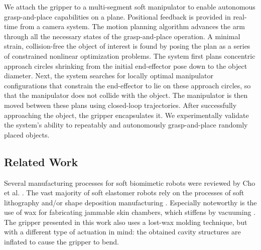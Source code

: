 We attach the gripper to a multi-segment soft manipulator to enable autonomous grasp-and-place capabilities on a plane. 
Positional feedback is provided in real-time from a camera system.
The motion planning algorithm advances the arm through all the necessary states of the grasp-and-place operation.
A minimal strain, collision-free  the object of interest is found by posing the plan as a series of constrained nonlinear optimization problems.
The system first plans concentric approach circles shrinking from the initial end-effector pose down to the object diameter.
Next, the system searches for locally optimal manipulator configurations that constrain the end-effector to lie on these approach circles, so that the manipulator does not collide with the object. 
The manipulator is then moved between these plans using closed-loop trajectories. 
After successfully approaching the object, the gripper encapsulates it.
We experimentally validate the system's ability to repeatably and autonomously grasp-and-place randomly placed objects.

\subsection{Related Work}

Several manufacturing processes for soft biomimetic robots were reviewed by Cho et al. \cite{cho2009review}. 
The vast majority of soft elastomer robots rely on the processes of soft lithography \cite{xia1998soft} and/or shape deposition manufacturing \cite{cham2002fast}. 
Especially noteworthy is the use of wax for fabricating jammable skin chambers, which stiffens by vacuuming \cite{steltz2009soft}. 
The gripper presented in this work also uses a lost-wax molding technique, but with a different type of actuation in mind: the obtained cavity structures are inflated to cause the gripper to bend.

